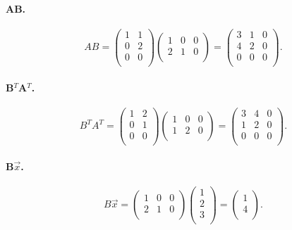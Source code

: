 \paragraph{AB.}
\[ 
AB = \begin{pmatrix}
1 & 1\\
0 & 2\\
0 & 0\\
\end{pmatrix} \begin{pmatrix}
1 & 0 & 0\\
2 & 1 & 0\\
\end{pmatrix} = \begin{pmatrix}
3 & 1 & 0\\
4 & 2 & 0\\
0 & 0 & 0\\
\end{pmatrix}
.\]

\paragraph{B$^T$A$^T$.}
\[ 
B^TA^T = \begin{pmatrix}
1 & 2\\
0 & 1\\
0 & 0\\
\end{pmatrix} \begin{pmatrix}
1 & 0 & 0\\
1 & 2 & 0\\
\end{pmatrix} = \begin{pmatrix}
3 & 4 & 0\\
1 & 2 & 0\\
0 & 0 & 0\\
\end{pmatrix}
.\]

\paragraph{B$\Vec{x}$.}
\[ 
B \Vec{x} = \begin{pmatrix}
1 & 0 & 0\\
2 & 1 & 0\\
\end{pmatrix} \begin{pmatrix}
1\\
2\\
3\\
\end{pmatrix} = \begin{pmatrix}
1\\
4\\
\end{pmatrix}
.\]

